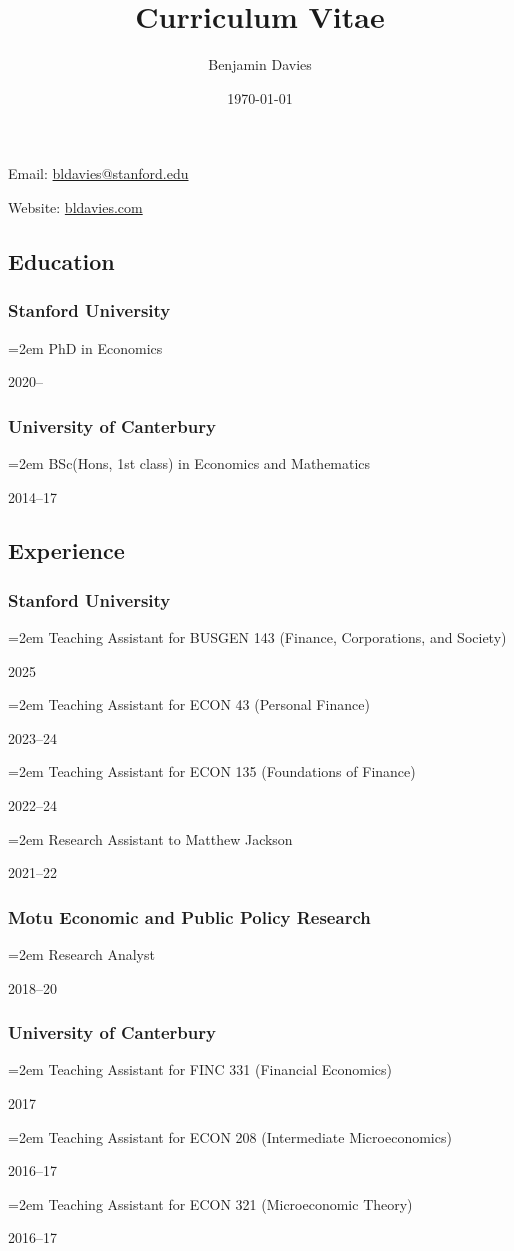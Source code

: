 \documentclass[11pt,oneside]{memoir}
\title{Curriculum Vitae}
\author{Benjamin Davies}
\date{\today}
\newcommand{\entry}[2]{\par\parbox[t]{0.9\linewidth}{\strut\raggedright\hangindent=2em #2\strut}\hfill#1}
\begin{document}
\chapter{\theauthor}

Email: \href{mailto:bldavies@stanford.edu}{bldavies@stanford.edu}

Website: \href{https://bldavies.com}{bldavies.com}

\section{Education}

\subsection{Stanford University}
\entry{2020--}{PhD in Economics}

\subsection{University of Canterbury}
\entry{2014--17}{BSc(Hons, 1st class) in Economics and Mathematics}

\section{Experience}

\subsection{Stanford University}
\entry{2025}{Teaching Assistant for BUSGEN 143 (Finance, Corporations, and Society)}
\entry{2023--24}{Teaching Assistant for ECON 43 (Personal Finance)}
\entry{2022--24}{Teaching Assistant for ECON 135 (Foundations of Finance)}
\entry{2021--22}{Research Assistant to Matthew Jackson}

\subsection{Motu Economic and Public Policy Research}
\entry{2018--20}{Research Analyst}

\subsection{University of Canterbury}
\entry{2017}{Teaching Assistant for FINC 331 (Financial Economics)}
\entry{2016--17}{Teaching Assistant for ECON 208 (Intermediate Microeconomics)}
\entry{2016--17}{Teaching Assistant for ECON 321 (Microeconomic Theory)}
\end{document}
